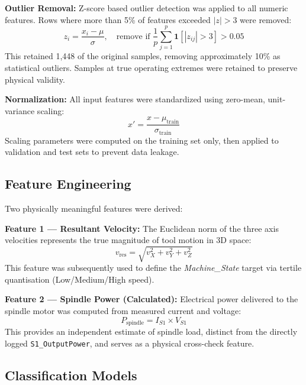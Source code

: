 \documentclass[conference]{IEEEtran}
\begin{document}
\textbf{Outlier Removal:} Z-score based outlier detection was applied to all numeric
features. Rows where more than 5\% of features exceeded $|z| > 3$ were removed:
\begin{equation}
    z_i = \frac{x_i - \mu}{\sigma}, \quad \text{remove if } \frac{1}{p}\sum_{j=1}^{p}
    \mathbf{1}[|z_{ij}|>3] > 0.05
    \label{eq:zscore}
\end{equation}
This retained 1,448 of the original samples, removing approximately 10\% as statistical
outliers. Samples at true operating extremes were retained to preserve physical validity.

\textbf{Normalization:} All input features were standardized using zero-mean,
unit-variance scaling:
\begin{equation}
    x' = \frac{x - \mu_{\text{train}}}{\sigma_{\text{train}}}
    \label{eq:scaling}
\end{equation}
Scaling parameters were computed on the training set only, then applied to validation
and test sets to prevent data leakage.

\subsection{Feature Engineering}
\label{sec:fe}

Two physically meaningful features were derived:

\textbf{Feature 1 — Resultant Velocity:} The Euclidean norm of the three axis velocities
represents the true magnitude of tool motion in 3D space:
\begin{equation}
    v_{\text{res}} = \sqrt{v_{X}^2 + v_{Y}^2 + v_{Z}^2}
    \label{eq:vres}
\end{equation}
This feature was subsequently used to define the \textit{Machine\_State} target via
tertile quantisation (Low/Medium/High speed).

\textbf{Feature 2 — Spindle Power (Calculated):} Electrical power delivered to the
spindle motor was computed from measured current and voltage:
\begin{equation}
    P_{\text{spindle}} = I_{S1} \times V_{S1}
    \label{eq:pspindle}
\end{equation}
This provides an independent estimate of spindle load, distinct from the directly
logged \texttt{S1\_OutputPower}, and serves as a physical cross-check feature.

\subsection{Classification Models}
\end{document}
